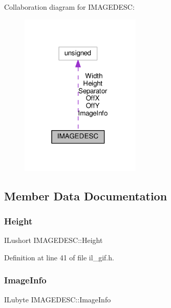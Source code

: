 Collaboration diagram for I\+M\+A\+G\+E\+D\+E\+SC\+:
\nopagebreak
\begin{figure}[H]
\begin{center}
\leavevmode
\includegraphics[width=163pt]{d6/d6a/structIMAGEDESC__coll__graph}
\end{center}
\end{figure}


\subsection{Member Data Documentation}
\mbox{\label{structIMAGEDESC_aa8e7ab942f4910512d16ef96ada73b60}} 
\subsubsection{\texorpdfstring{Height}{Height}}
{\footnotesize\ttfamily I\+Lushort I\+M\+A\+G\+E\+D\+E\+S\+C\+::\+Height}



Definition at line 41 of file il\+\_\+gif.\+h.

\mbox{\label{structIMAGEDESC_a0fe57020a09d4b0d584b21cc27b7a617}} 
\subsubsection{\texorpdfstring{Image\+Info}{ImageInfo}}
{\footnotesize\ttfamily I\+Lubyte I\+M\+A\+G\+E\+D\+E\+S\+C\+::\+Image\+Info}



